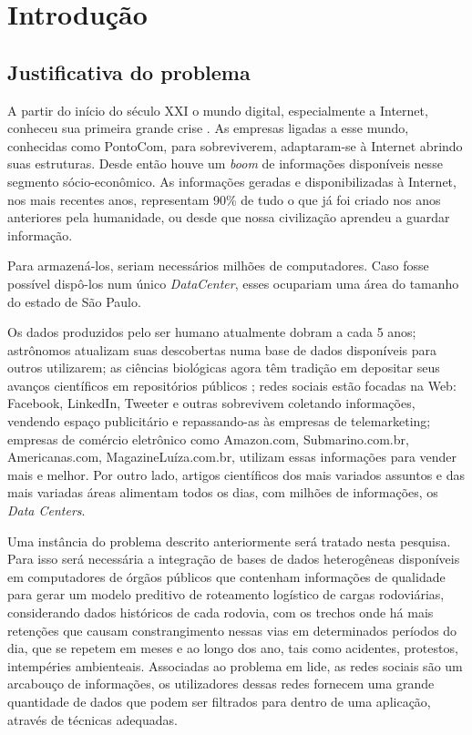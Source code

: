 \chapter{Introdução}\label{intro}

\section{Justificativa do problema}\label{intro:problem}

A partir do início do século XXI o mundo digital, especialmente a Internet, conheceu sua primeira grande crise \cite{Quadros2005}.
As empresas ligadas a esse mundo, conhecidas como PontoCom, para sobreviverem, adaptaram-se à Internet abrindo suas estruturas.
Desde então houve um \textit{boom} de informações disponíveis nesse segmento sócio-econômico.
As informações geradas e disponibilizadas à Internet, nos mais recentes anos, representam 90\% de tudo o que já foi criado nos anos 
anteriores pela humanidade, ou desde que nossa civilização aprendeu a guardar informação.

Para armazená-los, seriam necessários milhões de computadores. 
Caso fosse possível dispô-los num único \textit{DataCenter}, esses ocupariam uma área do tamanho do estado de São Paulo.

Os dados produzidos pelo ser humano atualmente dobram a cada 5 anos; astrônomos atualizam suas descobertas numa base de dados disponíveis para outros utilizarem; as ciências biológicas agora têm tradição 
em depositar seus avanços científicos em repositórios públicos \cite{bigdataMedicina}; redes sociais estão focadas na Web: Facebook, LinkedIn, Tweeter e outras 
sobrevivem coletando informações, vendendo espaço publicitário e repassando-as às empresas de telemarketing; empresas de comércio eletrônico como 
Amazon.com, Submarino.com.br, Americanas.com, MagazineLuíza.com.br, utilizam essas informações para vender mais e melhor. 
Por outro lado, artigos científicos dos mais variados assuntos e das mais variadas áreas alimentam todos os dias, com milhões de 
informações, os \textit{Data Centers}.

Uma instância do problema descrito anteriormente será tratado nesta pesquisa. 
Para isso será necessária a integração de bases de dados heterogêneas disponíveis em computadores de órgãos públicos 
que contenham informações de qualidade para gerar um modelo preditivo de roteamento logístico de cargas rodoviárias, considerando dados históricos de cada rodovia, com os trechos onde há mais 
retenções que causam constrangimento nessas vias em determinados períodos do dia, que se repetem em meses e ao longo dos ano, tais como acidentes, protestos, intempéries ambienteais.
Associadas ao problema em lide, as redes sociais são um arcabouço de informações, os utilizadores dessas redes fornecem uma grande quantidade de dados que podem ser filtrados para 
dentro de uma aplicação, através de técnicas adequadas.

